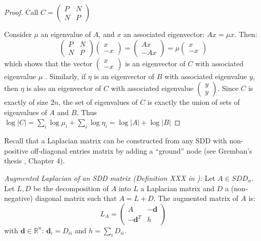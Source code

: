 \begin{proof} Call $C=\left(\begin{array}{cc}
P & N\\
N & P
\end{array}\right)$

Consider $\mu$ an eigenvalue of $A$, and $x$ an associated eigenvector:
$Ax=\mu x$. Then:
\[
\left(\begin{array}{cc}
P & N\\
N & P
\end{array}\right)\left(\begin{array}{c}
x\\
-x
\end{array}\right)=\left(\begin{array}{c}
Ax\\
-Ax
\end{array}\right)=\mu\left(\begin{array}{c}
x\\
-x
\end{array}\right)
\]
which shows that the vector $\left(\begin{array}{c}
x\\
-x
\end{array}\right)$ is an eigenvector of $C$ with associated eigenvalue $\mu$ . Similarly,
if $\eta$ is an eigenvector of $B$ with associated eigenvalue $y$,
then $\eta$ is also an eigenvector of $C$ with associated eigenvalue
$\left(\begin{array}{c}
y\\
y
\end{array}\right)$. Since $C$ is exactly of size $2n$, the set of eigenvalues of $C$
is exactly the union of sets of eigenvalues of $A$ and $B$. Thus
$\log\left|C\right|=\sum_{i}\log\mu_{i}+\sum_{i}\log\eta_{i}=\log\left|A\right|+\log\left|B\right|$

\end{proof}

Recall that a Laplacian matrix can be constructed from any SDD with
non-positive off-diagonal entries matrix by adding a ``ground''
node (see Gremban's thesis \cite{Gremban1996}, Chapter 4).

\begin{definition} \emph{Augmented Laplacian of an SDD matrix (Definition
XXX in \cite{Gremban1996}):} Let $A\in SDD_{n}$. Let $L,D$ be the
decomposition of $A$ into $L$ a Laplacian matrix and $D$ a (non-negative)
diagonal matrix such that $A=L+D$. The augmented matrix of $A$ is:
\[
L_{A}=\left(\begin{array}{cc}
A & -\mathbf{d}\\
-\mathbf{d}^{T} & h
\end{array}\right)
\]
with $\mathbf{d}\in\mathbb{R}^{n}$: $\mathbf{d}_{i}=D_{ii}$ and
$h=\sum_{i}D_{ii}$. \end{definition}

